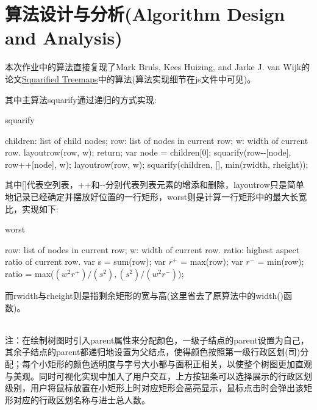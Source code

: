 \documentclass[11pt]{article}
\begin{document}
\newpage
	\section{算法设计与分析(Algorithm Design and Analysis)}
	本次作业中的算法直接复现了Mark Bruls, Kees Huizing, and Jarke J. van Wijk的论文\href{http://vis.pku.edu.cn/course/visclass_f21/material/Squarified_Treemap.pdf}{Squarified Treemaps}中的算法(算法实现细节在js文件中可见)。
	
	其中主算法squarify通过递归的方式实现:
	
	\begin{algorithm}[h]
		\caption{squarify}
		\begin{algorithmic}[1]
			\Require
			children: list of child nodes;
			row: list of nodes in current row;
			w: width of current row.
			 \State layoutrow(row, w);
			\EndIf
			\State return;
			\EndIf
			\State var node = children[0];
			\State squarify(row-\--[node], row++[node], w);
			\Else \State layoutrow(row, w);
			\State squarify(children, [], min(rwidth, rheight));
			\EndIf
		\end{algorithmic}
	\end{algorithm}

	其中[]代表空列表，++和-\--分别代表列表元素的增添和删除，layoutrow只是简单地记录已经确定并摆放好位置的一行矩形，worst则是计算一行矩形中的最大长宽比，实现如下:
	
	\begin{algorithm}[h]
		\caption{worst}
		\begin{algorithmic}[1]
			\Require
			row: list of nodes in current row;
			w: width of current row.
			\Ensure
			ratio: highest aspect ratio of current row.
			\State var s = sum(row);
			\State var $r^+$ = max(row);
			\State var $r^-$ = min(row);
			\State ratio = max($(w^2r^+)/(s^2), (s^2)/(w^2r^-)$);
		\end{algorithmic}
	\end{algorithm}
	
	而rwidth与rheight则是指剩余矩形的宽与高(这里省去了原算法中的width()函数)。
	
	\hspace*{\fill} \\
	
	注：在绘制树图时引入parent属性来分配颜色，一级子结点的parent设置为自己，其余子结点的parent都递归地设置为父结点，使得颜色按照第一级行政区划(司)分配；每个小矩形的颜色透明度与字号大小都与面积正相关，以使整个树图更加直观与美观。同时可视化实现中加入了用户交互，上方按钮条可以选择展示的行政区划级别，用户将鼠标放置在小矩形上时对应矩形会高亮显示，鼠标点击时会弹出该矩形对应的行政区划名称与进士总人数。
	
\end{document}

